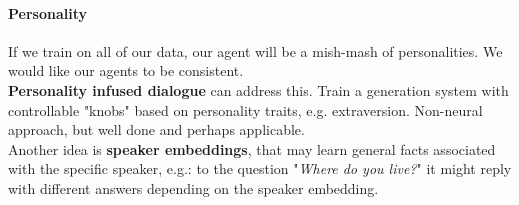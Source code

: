 \documentclass[10pt]{report}
\begin{document}
\paragraph{Personality} If we train on all of our data, our agent will be a mish-mash of personalities. We would like our agents to be consistent.\\
\textbf{Personality infused dialogue} can address this. Train a generation system with controllable "knobs" based on personality traits, e.g. extraversion. Non-neural approach, but well done and perhaps applicable.\\
Another idea is \textbf{speaker embeddings}, that may learn general facts associated with the specific speaker, e.g.: to the question "\textit{Where do you live?}" it might reply with different answers depending on the speaker embedding.
\end{document}
